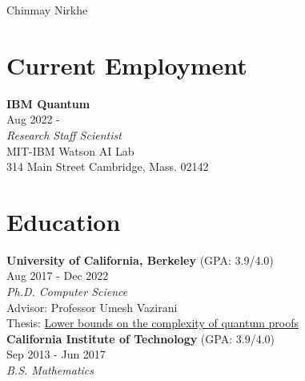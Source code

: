 \documentclass[11pt]{article}
\begin{document}


\par{
		{\LARGE {Chinmay Nirkhe}
	}\bigskip\par}



\section{Current Employment}
\textbf{IBM Quantum} \\
Aug 2022 - \\

\textit{Research Staff Scientist} \\
MIT-IBM Watson AI Lab \\
314 Main Street Cambridge, Mass. 02142


\section{Education}

\textbf{University of California, Berkeley} ({\small \textsc{GPA}: 3.9/4.0}) \\
Aug 2017 - Dec 2022\\

\textit{Ph.D. Computer Science} \\
Advisor: Professor Umesh Vazirani \\ 
Thesis: \href{https://www2.eecs.berkeley.edu/Pubs/TechRpts/2022/EECS-2022-236.html}{Lower bounds on the complexity of quantum proofs} \\

\textbf{California Institute of Technology} ({\small \textsc{GPA}: 3.9/4.0}) \\
Sep 2013 - Jun 2017 \\

\textit{B.S. Mathematics}
\end{document}

